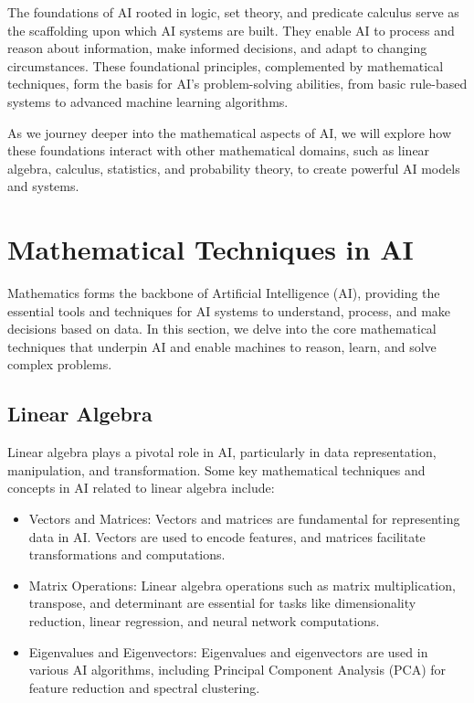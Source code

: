 \documentclass[conference]{IEEEtran}
\begin{document}
    The foundations of AI rooted in logic, set theory, and predicate calculus serve as the scaffolding upon which AI systems are built. They enable AI to process and reason about information, make informed decisions, and adapt to changing circumstances. These foundational principles, complemented by mathematical techniques, form the basis for AI's problem-solving abilities, from basic rule-based systems to advanced machine learning algorithms.

As we journey deeper into the mathematical aspects of AI, we will explore how these foundations interact with other mathematical domains, such as linear algebra, calculus, statistics, and probability theory, to create powerful AI models and systems.
    

    \section{Mathematical Techniques in AI}

    Mathematics forms the backbone of Artificial Intelligence (AI), providing the essential tools and techniques for AI systems to understand, process, and make decisions based on data. In this section, we delve into the core mathematical techniques that underpin AI and enable machines to reason, learn, and solve complex problems.

\subsection{Linear Algebra}

Linear algebra plays a pivotal role in AI, particularly in data representation, manipulation, and transformation. Some key mathematical techniques and concepts in AI related to linear algebra include:
    \begin{itemize}
      \item Vectors and Matrices: Vectors and matrices are fundamental for representing data in AI. Vectors are used to encode features, and matrices facilitate transformations and computations.

   \item Matrix Operations: Linear algebra operations such as matrix multiplication, transpose, and determinant are essential for tasks like dimensionality reduction, linear regression, and neural network computations.

    \item Eigenvalues and Eigenvectors: Eigenvalues and eigenvectors are used in various AI algorithms, including Principal Component Analysis (PCA) for feature reduction and spectral clustering.
    \end{itemize}
\end{document}
